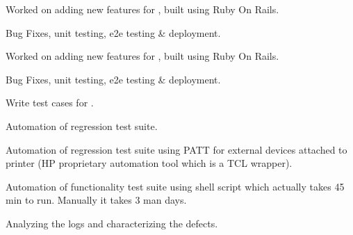 \documentclass[]{my-resume-openfont}
\begin{document}
\begin{minipage}[t]{0.66\textwidth}
\begin{tightemize}
\item{Worked on adding new features for , built using Ruby On Rails.}
\item{Bug Fixes, unit testing, e2e testing \& deployment.}
\end{tightemize}
\sectionsep

\begin{tightemize}
\item{Worked on adding new features for , built using Ruby On Rails.}
\item{Bug Fixes, unit testing, e2e testing \& deployment.}
\end{tightemize}
\sectionsep

\begin{tightemize}
\item{Write test cases for .}
\item{Automation of regression test suite.}
\end{tightemize}
\sectionsep

\begin{tightemize}
\item{Automation of regression test suite using PATT for external devices attached to printer (HP proprietary automation tool which is a TCL wrapper).}
\item{Automation of functionality test suite using shell script which actually takes 45 min to run. Manually it takes 3 man days.}
\item{Analyzing the logs and characterizing the defects.}
\end{tightemize}
\sectionsep

\end{minipage} 
\end{document}
